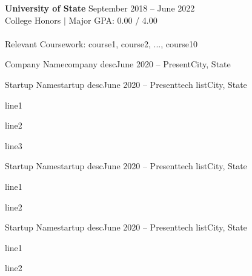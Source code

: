 \documentclass[hidelinks]{simp_styling} %
\begin{document}
\printname
\printbyline



{\bf University of State} \hfill {September 2018 – June 2022} \\
College Honors $\mid$ Major \hfill {GPA: 0.00 / 4.00} \\
\vspace*{-3.5mm} \\
Relevant Coursework: course1, course2, ..., course10



\begin{rSubsection}{Company Name}{company desc}{June 2020 – Present}{}{City, State}
\end{rSubsection}

\begin{rSubsection}{Startup Name}{startup desc}{June 2020 – Present}{tech list}{City, State}
\item line1
\item line2
\item line3
\end{rSubsection}



\begin{rSubsection}{Startup Name}{startup desc}{June 2020 – Present}{tech list}{City, State}
\item line1
\item line2
\end{rSubsection}

\begin{rSubsection}{Startup Name}{startup desc}{June 2020 – Present}{tech list}{City, State}
\item line1
\item line2
\end{rSubsection}
\end{document}
